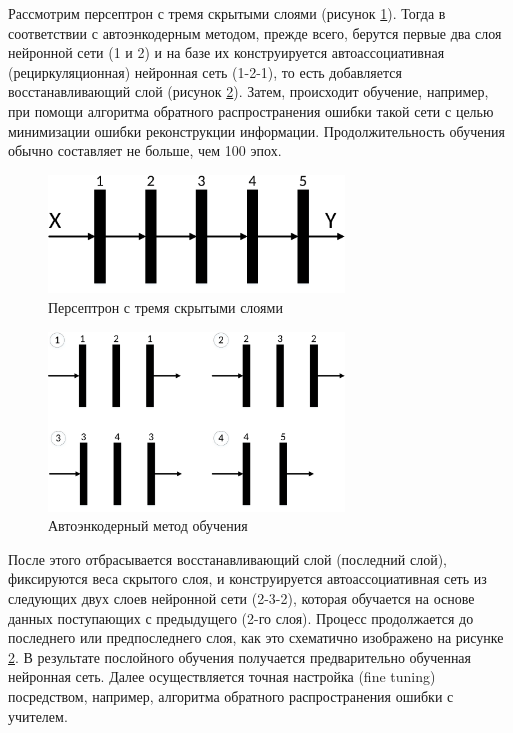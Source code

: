 Рассмотрим персептрон с тремя скрытыми слоями (рисунок \ref{fig:pic1_5}). Тогда в соответствии с автоэнкодерным методом, прежде всего, берутся первые два слоя нейронной сети (1 и 2) и на базе их конструируется автоассоциативная (рециркуляционная) нейронная сеть (1-2-1), то есть добавляется восстанавливающий слой (рисунок \ref{fig:pic1_6}). Затем, происходит обучение, например, при помощи алгоритма обратного распространения ошибки такой сети с целью минимизации ошибки реконструкции информации. Продолжительность обучения обычно составляет не больше, чем 100 эпох. 

\begin{figure}[H]
	\centering
	\includegraphics[width=0.7\textwidth]{author/part3/figures/pic1-5.pdf}
	\caption{Персептрон с тремя скрытыми слоями}
	\label{fig:pic1_5}
\end{figure}	

\begin{figure}[H]
	\centering
	\includegraphics[width=0.7\textwidth]{author/part3/figures/pic1-6.pdf}
	\caption{Автоэнкодерный метод обучения}
	\label{fig:pic1_6}
\end{figure}

После этого отбрасывается восстанавливающий слой (последний слой), фиксируются веса скрытого слоя, и конструируется автоассоциативная сеть из следующих двух слоев нейронной сети (2-3-2), которая обучается на основе данных поступающих с предыдущего (2-го слоя). Процесс продолжается до последнего или предпоследнего слоя, как это схематично изображено на рисунке \ref{fig:pic1_6}. В результате послойного обучения получается предварительно обученная нейронная сеть. Далее осуществляется точная настройка (fine tuning) посредством, например, алгоритма обратного распространения ошибки с учителем.


